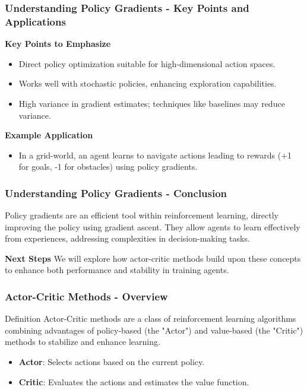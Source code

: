 \documentclass[aspectratio=169]{beamer}
\begin{document}
\begin{frame}[fragile]
    \frametitle{Understanding Policy Gradients - Key Points and Applications}
    \textbf{Key Points to Emphasize}
    \begin{itemize}
        \item Direct policy optimization suitable for high-dimensional action spaces.
        \item Works well with stochastic policies, enhancing exploration capabilities.
        \item High variance in gradient estimates; techniques like baselines may reduce variance.
    \end{itemize}

    \textbf{Example Application}
    \begin{itemize}
        \item In a grid-world, an agent learns to navigate actions leading to rewards (+1 for goals, -1 for obstacles) using policy gradients.
    \end{itemize}
\end{frame}

\begin{frame}[fragile]
    \frametitle{Understanding Policy Gradients - Conclusion}
    Policy gradients are an efficient tool within reinforcement learning, directly improving the policy using gradient ascent. They allow agents to learn effectively from experiences, addressing complexities in decision-making tasks.

    \textbf{Next Steps}
    We will explore how actor-critic methods build upon these concepts to enhance both performance and stability in training agents.
\end{frame}

\begin{frame}[fragile]
    \frametitle{Actor-Critic Methods - Overview}
    \begin{block}{Definition}
        Actor-Critic methods are a class of reinforcement learning algorithms combining advantages of policy-based (the "Actor") and value-based (the "Critic") methods to stabilize and enhance learning.
    \end{block}

    \begin{itemize}
        \item \textbf{Actor}: Selects actions based on the current policy.
        \item \textbf{Critic}: Evaluates the actions and estimates the value function.
    \end{itemize}
\end{frame}
\end{document}
